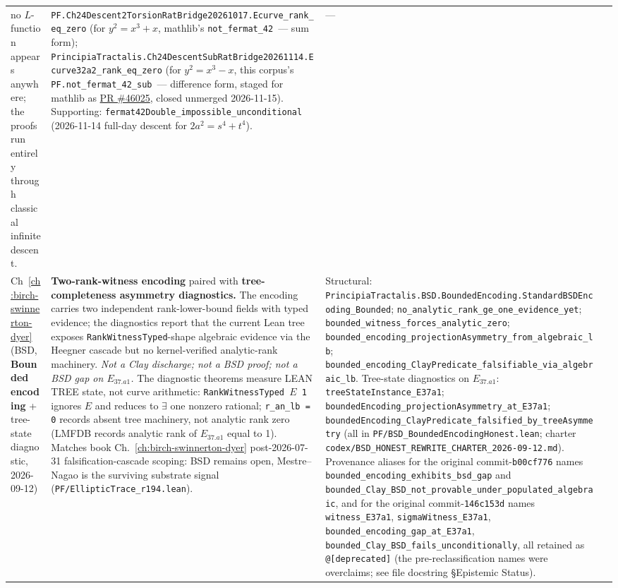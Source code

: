\begin{table}[h]
\begin{tabular}{p{1.7cm}p{4.2cm}p{5.6cm}c}
no $L$-function appears anywhere; the proofs run entirely through
classical infinite descent.
& \texttt{PF.Ch24Descent2TorsionRatBridge20261017.Ecurve\_rank\_eq\_zero}
(for $y^2 = x^3 + x$, mathlib's
\texttt{not\_fermat\_42}~--- sum form);
\texttt{PrincipiaTractalis.Ch24DescentSubRatBridge20261114.Ecurve32a2\_rank\_eq\_zero}
(for $y^2 = x^3 - x$, this corpus's \texttt{PF.not\_fermat\_42\_sub}~---
difference form, staged for mathlib as
\href{https://github.com/leanprover-community/mathlib4/pull/46025}{PR
\#46025}, closed unmerged 2026-11-15).
Supporting: \texttt{fermat42Double\_impossible\_unconditional}
(2026-11-14 full-day descent for $2a^2 = s^4 + t^4$).
& --- \\
Ch~\ref{ch:birch-swinnerton-dyer} (BSD, \textbf{Bounded encoding} + tree-state diagnostic, 2026-09-12)
& \textbf{Two-rank-witness encoding} paired with \textbf{tree-completeness asymmetry diagnostics.} The encoding carries two independent rank-lower-bound fields with typed evidence; the diagnostics report that the current Lean tree exposes \texttt{RankWitnessTyped}-shape algebraic evidence via the Heegner cascade but no kernel-verified analytic-rank machinery. \emph{Not a Clay discharge; not a BSD proof; not a BSD gap on \(E_{37.a1}\).} The diagnostic theorems measure LEAN TREE state, not curve arithmetic: \texttt{RankWitnessTyped $E$ 1} ignores $E$ and reduces to $\exists$ one nonzero rational; \texttt{r\_an\_lb = 0} records absent tree machinery, not analytic rank zero (LMFDB records analytic rank of $E_{37.a1}$ equal to 1). Matches book Ch.~\ref{ch:birch-swinnerton-dyer} post-2026-07-31 falsification-cascade scoping: BSD remains open, Mestre--Nagao is the surviving substrate signal (\texttt{PF/EllipticTrace\_r194.lean}).
& Structural: \texttt{PrincipiaTractalis.BSD.BoundedEncoding.StandardBSDEncoding\_Bounded}; \texttt{no\_analytic\_rank\_ge\_one\_evidence\_yet}; \texttt{bounded\_witness\_forces\_analytic\_zero}; \texttt{bounded\_encoding\_projectionAsymmetry\_from\_algebraic\_lb}; \texttt{bounded\_encoding\_ClayPredicate\_falsifiable\_via\_algebraic\_lb}. Tree-state diagnostics on $E_{37.a1}$: \texttt{treeStateInstance\_E37a1}; \texttt{boundedEncoding\_projectionAsymmetry\_at\_E37a1}; \texttt{boundedEncoding\_ClayPredicate\_falsified\_by\_treeAsymmetry} (all in \texttt{PF/BSD\_BoundedEncodingHonest.lean}; charter \texttt{codex/BSD\_HONEST\_REWRITE\_CHARTER\_2026-09-12.md}). Provenance aliases for the original commit-\texttt{b00cf776} names \texttt{bounded\_encoding\_exhibits\_bsd\_gap} and \texttt{bounded\_Clay\_BSD\_not\_provable\_under\_populated\_algebraic}, and for the original commit-\texttt{146c153d} names \texttt{witness\_E37a1}, \texttt{sigmaWitness\_E37a1}, \texttt{bounded\_encoding\_gap\_at\_E37a1}, \texttt{bounded\_Clay\_BSD\_fails\_unconditionally}, all retained as \texttt{@[deprecated]} (the pre-reclassification names were overclaims; see file docstring \S Epistemic Status).

\end{tabular}
\end{table}
